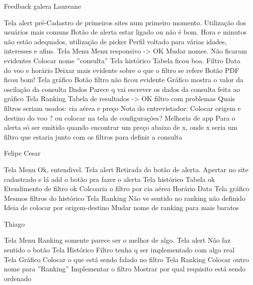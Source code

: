Feedback galera
Laureane
	
	Tela alert
		pré-Cadastro de primeiros sites num primeiro momento.
			Utilização dos usuários mais comuns
		Botão de alerta estar ligado ou não é bom.
		Hora e minutos não estão adequados, utilização de picker
		Perfil voltado para várias idades, interesses e afins.
	Tela Menu
		Menu responsivo -> OK
		Mudar nomes. Não ficaram evidentes
		Colocar nome ''consulta''
	Tela histórico
		Tabela ficou boa.
		Filtro
			Data do voo e horário
			Deixar mais evidente sobre o que o filtro se refere
		Botão PDF ficou bom!
	Tela gráfico
		Botão filtro não ficou evidente
		Gráfico mostra o valor da oscilação da consulta
		Dados 
			Parece q vai escrever os dados da consulta feita ao gráfico
	Tela Ranking
		Tabela de resultados -> OK
		filtro com problemas
			Quais filtros seriam usados: cia aérea e preço
		Nota do entrevistador:
			Colocar origem e destino do voo ? ou colocar na tela de configurações?
	Melhoria de app
		Para o alerta só ser emitido quando encontrar um preço abaixo de x, onde x seria um filtro que estaria junto com os filtros para definir a consulta

Felipe Cesar
	
	Tela Menu
		Ok, entendivel.
	Tela alert
		Retirada do botão de alerta.
			Apertar no site cadastrado e lá add o botão pra fazer o alerta
	Tela histórico
		Tabela ok
		Etendimento de filtro ok
			Colcoaria o filtro por 
				cia aérea
				Horário
				Data
	Tela gráfico
		Mesmos filtros do histórico
	Tela Ranking
		Não ve sentido no ranking não definido
		Ideia de colocar por origem-destino
		Mudar nome de ranking para mais baratos

Thiago
	
	Tela Menu
		Ranking somente parece ser o melhor de algo.
	Tela alert
		Não faz sentido o botão
	Tela Histórico
		Filtro tenha q ser implementado com algo real
	Tela Gráfico
		Colocar o que está sendo falado no filtro
	Tela Ranking
		Colocar outro nome para ''Ranking''
		Implementar o filtro
		Mostrar por qual requisito está sendo ordenado
